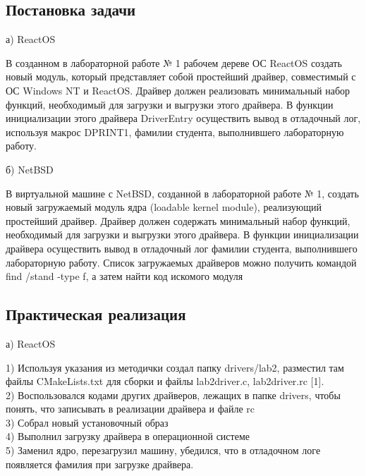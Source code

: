 \documentclass[a4paper, 14pt]{extarticle}
\begin{document}
\newpage
\begin{center}
\section{Постановка задачи}
а) ReactOS
\end{center}
В  созданном  в  лабораторной  работе  № 1  рабочем дереве  ОС ReactOS создать новый модуль, который представляет собой простейший  драйвер,  совместимый  с  ОС  Windows  NT  и  ReactOS. Драйвер  должен реализовать  минимальный  набор функций,  необходимый  для  загрузки  и  выгрузки  этого  драйвера. В  функции инициализации  этого  драйвера  DriverEntry  осуществить вывод  в отладочный  лог,  используя макрос  DPRINT1, фамилии студента, выполнившего лабораторную работу.

\begin{center}
б) NetBSD
\end{center}
В виртуальной  машине  с NetBSD, созданной  в  лабораторной работе  №  1,  создать  новый  загружаемый  модуль  ядра  (loadable kernel module), реализующий простейший драйвер. Драйвер  должен содержать  минимальный  набор  функций,  необходимый  для загрузки  и  выгрузки  этого  драйвера.  В функции  инициализации  драйвера осуществить вывод в отладочный лог фамилии студента, выполнившего лабораторную работу. Список  загружаемых  драйверов  можно  получить  командой find /stand -type f, а затем найти код искомого модуля


\vspace{0.1em}


\newpage
\vspace{2em}
\begin{center}
\section{Практическая реализация}\label{Sect::res}
а) ReactOS
\end{center}
1) Используя указания из методички создал папку drivers/lab2, разместил
там файлы CMakeLists.txt для сборки и файлы lab2driver.c, lab2driver.rc [1].\\
2) Воспользовался кодами других драйверов, лежащих в папке drivers,
чтобы понять, что записывать в реализации драйвера и файле rc\\
3) Собрал новый установочный образ\\
4) Выполнил загрузку драйвера в операционной системе\\
5) Заменил ядро, перезагрузил машину, убедился, что в отладочном логе
появляется фамилия при загрузке драйвера.\\
\end{document}
